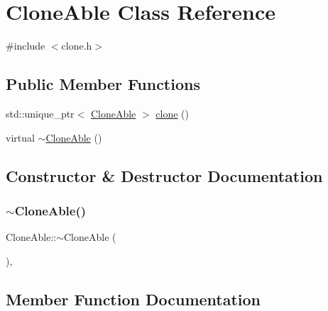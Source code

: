 \hypertarget{classCloneAble}{}\section{Clone\+Able Class Reference}
\label{classCloneAble}


{\ttfamily \#include $<$clone.\+h$>$}

\subsection*{Public Member Functions}
\begin{DoxyCompactItemize}
\item 
std\+::unique\+\_\+ptr$<$ \hyperlink{classCloneAble}{Clone\+Able} $>$ \hyperlink{classCloneAble_a7baa0f4664624ed49f12330576da421c}{clone} ()
\item 
virtual \hyperlink{classCloneAble_a1437fc4dbdf5e6123b3e7b691326a965}{$\sim$\+Clone\+Able} ()
\end{DoxyCompactItemize}


\subsection{Constructor \& Destructor Documentation}
\mbox{\label{classCloneAble_a1437fc4dbdf5e6123b3e7b691326a965}} 
\subsubsection{\texorpdfstring{$\sim$\+Clone\+Able()}{~CloneAble()}}
{\footnotesize\ttfamily Clone\+Able\+::$\sim$\+Clone\+Able (\begin{DoxyParamCaption}{ }\end{DoxyParamCaption})\hspace{0.3cm}{\ttfamily [virtual]}, {\ttfamily [default]}}



\subsection{Member Function Documentation}
\mbox{\label{classCloneAble_a7baa0f4664624ed49f12330576da421c}} 
